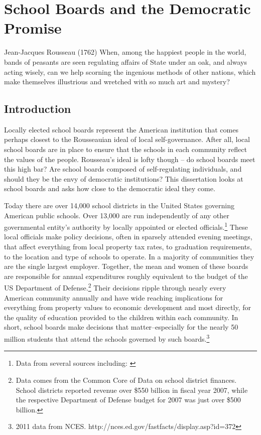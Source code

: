 \chapter{School Boards and the Democratic Promise}
\label{chap:intro}

\begin{wbepi}{Jean-Jacques Rousseau (1762)}
When, among the happiest people in the world, bands of peasants are seen regulating 
affairs of State under an oak, and always acting wisely, can we help scorning the 
ingenious methods of other nations, which make themselves illustrious and wretched 
with so much art and mystery?
\end{wbepi}

\section{Introduction}

Locally elected school boards represent the American institution that comes 
perhaps closest to the Rousseauian ideal of local self-governance. After all, 
local school boards are in place to ensure that the schools in each community 
reflect the values of the people. Rousseau's ideal is lofty though -- do 
school boards meet this high bar? Are school boards composed of self-regulating 
individuals, and should they be the envy of democratic institutions? This 
dissertation looks at school boards and asks how close to the democratic ideal 
they come. 

Today there are over 14,000 school districts in the United States governing 
American public schools. Over 13,000 are run independently of any other 
governmental entity's authority by locally appointed or elected officials.\footnote{Data from several sources including: \citep{RefWorks:325,RefWorks:321,
RefWorks:322}}  These local officials make policy decisions, often in sparsely 
attended evening meetings, that affect everything from local property tax rates, 
to graduation requirements, to the location and type of schools to operate. In a 
majority of communities they are the single largest employer. Together, the mean 
and women of these boards are responsible for annual expenditures roughly equivalent 
to the budget of the US Department of Defense.\footnote{Data comes from the Common 
Core of Data on school district finances. School districts reported revenue over 
\$550 billion in fiscal year 2007, while the respective Department of Defense 
budget for 2007 was just over \$500 billion.} Their decisions ripple through 
nearly every American community annually and have wide reaching implications for 
everything from property values to economic development and most directly, for the 
quality of education provided to the children within each community. In short, school 
boards make decisions that matter--especially for the nearly 50 million students 
that attend the schools governed by such boards.\footnote{2011 data from NCES. 
http://nces.ed.gov/fastfacts/display.asp?id=372} 

